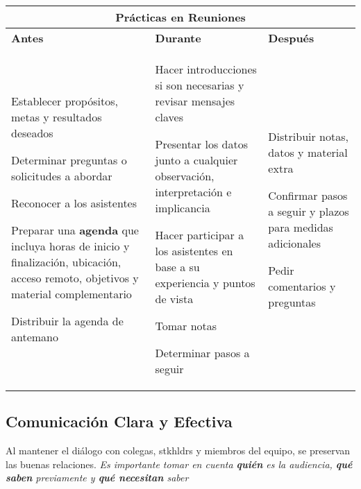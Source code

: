 \begin{table}
    \centering
    \begin{tabular}{|p{4.8cm}|p{4.8cm}|p{4.7cm}}
        \hline
        \multicolumn{3}{|c|}{Prácticas en Reuniones} \\
        \hline
        \textbf{Antes} & \textbf{Durante}  &\textbf{Después} \\
        \hline
        \begin{description}
            \item {Establecer propósitos, metas y resultados deseados}
            \item {Determinar preguntas o solicitudes a abordar}
            \item {Reconocer a los asistentes}
            \item {Preparar una \textbf{agenda} que incluya horas de inicio y finalización, ubicación, acceso remoto, objetivos y material complementario}
            \item {Distribuir la agenda de antemano}
        \end{description} & \begin{description}
            \item {Hacer introducciones si son necesarias y revisar mensajes claves}
            \item {Presentar los datos junto a cualquier observación, interpretación e implicancia}
            \item {Hacer participar a los asistentes en base a su experiencia y puntos de vista}
            \item {Tomar notas}
            \item {Determinar pasos a seguir}
        \end{description} &  \begin{description}
            \item {Distribuir notas, datos y material extra}
            \item {Confirmar pasos a seguir y plazos para medidas adicionales}
            \item {Pedir comentarios y preguntas}
        \end{description} \\
        \hline
    \end{tabular}
\end{table}

\subsection{Comunicación Clara y Efectiva}
Al mantener el diálogo con colegas, \gls{stkhldrs} y miembros del equipo, se preservan las buenas relaciones. \textit{Es importante tomar en cuenta \textbf{quién} es la audiencia, \textbf{qué saben} previamente y \textbf{qué necesitan} saber}

